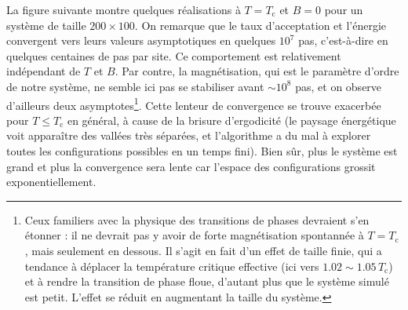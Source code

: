 \documentclass{book}
\begin{document}
\begin{correction}
La figure suivante montre quelques réalisations à $T=T_\text{c}$ et $B=0$ pour un système de taille $200 \times 100$. On remarque que le taux d'acceptation et l'énergie convergent vers leurs valeurs asymptotiques en quelques $10^7$ pas, c'est-à-dire en quelques centaines de pas par site. Ce comportement est relativement indépendant de $T$ et $B$. Par contre, la magnétisation, qui est le paramètre d'ordre de notre système, ne semble ici pas se stabiliser avant $\sim 10^8$ pas, et on observe d'ailleurs deux asymptotes\footnote{Ceux familiers avec la physique des transitions de phases devraient s'en étonner : il ne devrait pas y avoir de forte magnétisation spontannée à $T=T_\text{c}$, mais seulement en dessous. Il s'agit en fait d'un effet de taille finie, qui a tendance à déplacer la température critique effective (ici vers $1.02 \sim 1.05 \,T_\text{c}$) et à rendre la transition de phase floue, d'autant plus que le système simulé est petit. L'effet se réduit en augmentant la taille du système.}. Cette lenteur de convergence se trouve exacerbée pour $T \leq T_\text{c}$ en général, à cause de la brisure d'ergodicité (le paysage énergétique voit apparaître des vallées très séparées, et l'algorithme a du mal à explorer toutes les configurations possibles en un temps fini). Bien sûr, plus le système est grand et plus la convergence sera lente car l'espace des configurations grossit exponentiellement.\\


\end{correction}
\end{document}
